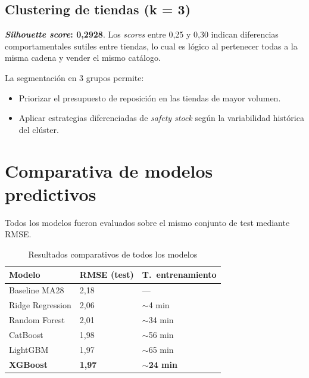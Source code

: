 \documentclass[12pt, a4paper, oneside]{report}
\begin{document}
\subsection{Clustering de tiendas (k = 3)}

\textbf{\textit{Silhouette score}: 0,2928}. Los \textit{scores} entre 0,25 y 0,30 indican diferencias comportamentales sutiles entre tiendas, lo cual es l\'ogico al pertenecer todas a la misma cadena y vender el mismo cat\'alogo.

La segmentaci\'on en 3 grupos permite:
\begin{itemize}[leftmargin=*, noitemsep]
  \item Priorizar el presupuesto de reposici\'on en las tiendas de mayor volumen.
  \item Aplicar estrategias diferenciadas de \textit{safety stock} seg\'un la variabilidad hist\'orica del cl\'uster.
\end{itemize}

\section{Comparativa de modelos predictivos}

Todos los modelos fueron evaluados sobre el mismo conjunto de test mediante RMSE.

\begin{table}[H]
  \centering
  \caption{Resultados comparativos de todos los modelos}
  \label{tab:modelos_full}
  \begin{tabularx}{0.8\textwidth}{L{5cm} C{3cm} C{3.5cm}}
    \toprule
    {\color{white}\textbf{Modelo}} &
    {\color{white}\textbf{RMSE (test)}} &
    {\color{white}\textbf{T.\ entrenamiento}} \\
    \midrule
       Baseline MA28      & 2,18 & --- \\
      Ridge Regression   & 2,06 & $\sim$4 min \\
       Random Forest      & 2,01 & $\sim$34 min \\
      CatBoost           & 1,98 & $\sim$56 min \\
       LightGBM           & 1,97 & $\sim$65 min \\
      \textbf{XGBoost}   & \textbf{1,97} & \textbf{$\sim$24 min} \\
    \bottomrule
  \end{tabularx}
\end{table}
\end{document}
